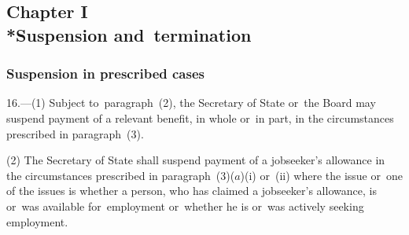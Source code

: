 \documentclass[12pt,a4paper]{article}
\begin{document}
\subsection[Chapter I --- Suspension and~termination]{Chapter I\\*Suspension and~termination}

\subsubsection[16. Suspension in prescribed cases]{Suspension in prescribed cases}

\renewcommand\parthead{--- Part~III Chapter I}

16.—(1) Subject to~paragraph~(2), the Secretary of State 
or~the Board  %
may suspend payment of a relevant benefit, in whole or~in part, in the circumstances prescribed in paragraph~(3).

(2) The Secretary of State shall suspend payment of a jobseeker’s allowance in the circumstances prescribed in paragraph~(3)($a$)(i) or~(ii) where the issue or~one of the issues is whether a person, who has claimed a jobseeker’s allowance, is or~was available for~employment or~whether he is or~was actively seeking employment.
\end{document}
